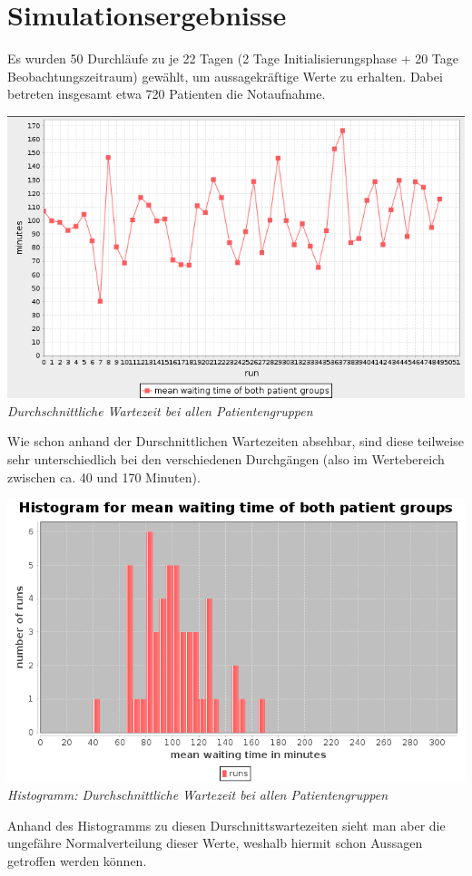 \documentclass{article}
\begin{document}
\section{Simulationsergebnisse}

Es wurden 50 Durchläufe zu je 22 Tagen (2 Tage Initialisierungsphase + 20 Tage Beobachtungszeitraum) gewählt, um aussagekräftige Werte zu erhalten. Dabei betreten insgesamt etwa 720 Patienten die Notaufnahme.\\
\begin{center}
\includegraphics[scale=0.35]{img/avg_waiting.png}\\
\textit{Durchschnittliche Wartezeit bei allen Patientengruppen}\\
\end{center}
\vspace{\baselineskip}
Wie schon anhand der Durschnittlichen Wartezeiten absehbar, sind diese teilweise sehr unterschiedlich bei den verschiedenen Durchgängen (also im Wertebereich zwischen ca. 40 und 170 Minuten).

\begin{center}
\includegraphics[scale=0.4]{img/avg_wait_histogram.png}\\
\textit{Histogramm: Durchschnittliche Wartezeit bei allen Patientengruppen}\\
\vspace{\baselineskip}
\end{center}
Anhand des Histogramms zu diesen Durschnittswartezeiten sieht man aber die ungefähre Normalverteilung dieser Werte, weshalb hiermit schon Aussagen getroffen werden können.
\end{document}
